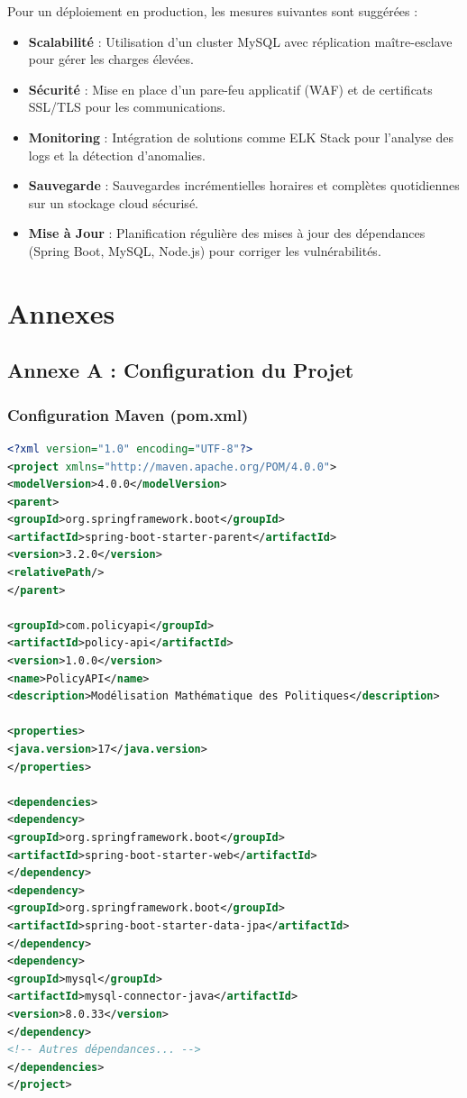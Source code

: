 \documentclass[12pt,a4paper]{article}
\begin{document}
\begin{tcolorbox}[colback=secondarygreen!5,colframe=secondarygreen,title=Recommandations]
Pour un déploiement en production, les mesures suivantes sont suggérées :
\begin{itemize}
\item \textbf{Scalabilité} : Utilisation d'un cluster MySQL avec réplication maître-esclave pour gérer les charges élevées.
\item \textbf{Sécurité} : Mise en place d'un pare-feu applicatif (WAF) et de certificats SSL/TLS pour les communications.
\item \textbf{Monitoring} : Intégration de solutions comme ELK Stack pour l'analyse des logs et la détection d'anomalies.
\item \textbf{Sauvegarde} : Sauvegardes incrémentielles horaires et complètes quotidiennes sur un stockage cloud sécurisé.
\item \textbf{Mise à Jour} : Planification régulière des mises à jour des dépendances (Spring Boot, MySQL, Node.js) pour corriger les vulnérabilités.
\end{itemize}
\end{tcolorbox}

\newpage

\section{Annexes}

\subsection{Annexe A : Configuration du Projet}

\subsubsection{Configuration Maven (pom.xml)}

\begin{codebox}
\begin{lstlisting}[language=XML]
<?xml version="1.0" encoding="UTF-8"?>
<project xmlns="http://maven.apache.org/POM/4.0.0">
<modelVersion>4.0.0</modelVersion>
<parent>
<groupId>org.springframework.boot</groupId>
<artifactId>spring-boot-starter-parent</artifactId>
<version>3.2.0</version>
<relativePath/>
</parent>

<groupId>com.policyapi</groupId>
<artifactId>policy-api</artifactId>
<version>1.0.0</version>
<name>PolicyAPI</name>
<description>Modélisation Mathématique des Politiques</description>

<properties>
<java.version>17</java.version>
</properties>

<dependencies>
<dependency>
<groupId>org.springframework.boot</groupId>
<artifactId>spring-boot-starter-web</artifactId>
</dependency>
<dependency>
<groupId>org.springframework.boot</groupId>
<artifactId>spring-boot-starter-data-jpa</artifactId>
</dependency>
<dependency>
<groupId>mysql</groupId>
<artifactId>mysql-connector-java</artifactId>
<version>8.0.33</version>
</dependency>
<!-- Autres dépendances... -->
</dependencies>
</project>
\end{lstlisting}
\end{codebox}
\end{document}
